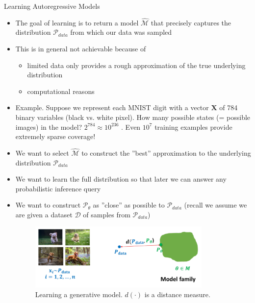 \begin{frame}[allowframebreaks]{Learning Autoregressive Models}
\begin{itemize}
    \item The goal of learning is to return a model $\hat{\mathcal{M}}$ that precisely captures the distribution $\mathcal{P}_{data}$ from which our data was sampled
    \item This is in general not achievable because of
    \begin{itemize}
        \item limited data only provides a rough approximation of the true underlying distribution
        \item computational reasons
    \end{itemize}
    \item Example. Suppose we represent each MNIST digit with a vector $\mathbf{X}$ of 784 binary variables (black vs. white pixel). How many possible states (= possible images) in the model? $2^{784} \approx 10^{236}$ . Even $10^7$ training examples provide extremely sparse coverage!
    \item We want to select $\hat{\mathcal{M}}$ to construct the ”best” approximation to the underlying distribution $\mathcal{P}_{data}$


\end{itemize}

\framebreak

\begin{itemize}
    \item We want to learn the full distribution so that later we can answer any probabilistic inference query
    \item We want to construct $\mathcal{P}_{\theta}$ as ”close” as possible to $\mathcal{P}_{data}$ (recall we assume we are given a dataset $\mathcal{D}$ of samples from $\mathcal{P}_{data}$)
    \begin{figure}
        \centering
        \includegraphics[height=1.3in]{images/arm/learning.png}
        \caption{Learning a generative model. $d(\cdot)$ is a distance measure.}
    \end{figure}
    
\end{itemize}
\end{frame}

